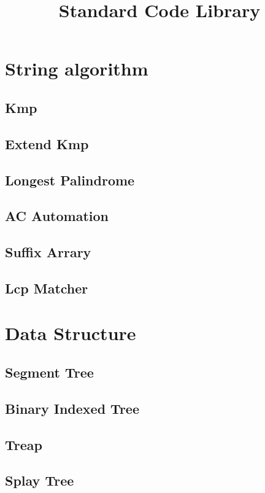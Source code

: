 \documentclass{article}
\title{Standard Code Library}
\author{}
\date{}
\begin{document}
	\maketitle

	\newpage
	\tableofcontents

	\newpage

	\section{String algorithm}
		\subsection{Kmp}
		\subsection{Extend Kmp}
			
		\subsection{Longest Palindrome}
			
		\subsection{AC Automation}
		\subsection{Suffix Arrary}
		\subsection{Lcp Matcher}
	\section{Data Structure}
		\subsection{Segment Tree}
			
		\subsection{Binary Indexed Tree}
		\subsection{Treap}
			
		\subsection{Splay Tree}
			
\end{document}
